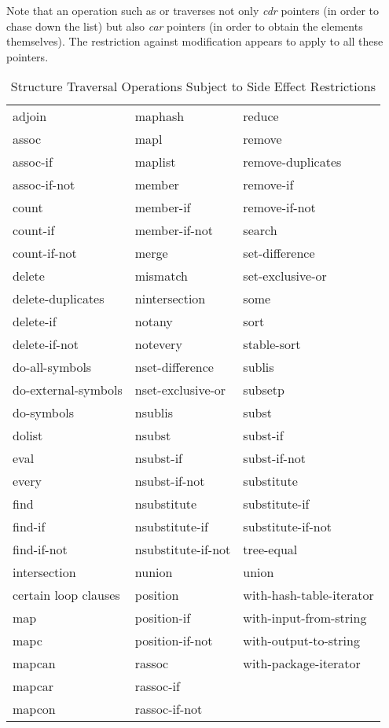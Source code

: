 Note that an operation such as  or  traverses
not only \emph{cdr} pointers (in order to chase down the list)
but also \emph{car} pointers (in order to obtain the elements themselves).
The restriction against modification appears to apply to all these pointers.

\begin{table}[t]
\leavevmode

\caption{Structure Traversal Operations Subject to Side Effect Restrictions}
\label{TRAVERSAL-OPERATIONS-TABLE}

\begingroup
\cf {}\relax
\begin{tabular*}{\textwidth}{@{}l@{\extracolsep{\fill}}ll@{}}
adjoin & maphash & reduce \\
assoc & mapl & remove \\
assoc-if & maplist & remove-duplicates \\
assoc-if-not & member & remove-if \\
count & member-if & remove-if-not \\
count-if & member-if-not & search \\
count-if-not & merge & set-difference \\
delete & mismatch & set-exclusive-or \\
delete-duplicates & nintersection & some \\
delete-if & notany & sort \\
delete-if-not & notevery & stable-sort \\
do-all-symbols & nset-difference & sublis \\
do-external-symbols & nset-exclusive-or & subsetp \\
do-symbols & nsublis & subst \\
dolist & nsubst & subst-if \\
eval & nsubst-if & subst-if-not \\
every & nsubst-if-not & substitute \\
find & nsubstitute & substitute-if \\
find-if & nsubstitute-if & substitute-if-not \\
find-if-not & nsubstitute-if-not & tree-equal \\
intersection & nunion & union \\
\textrm{certain} loop \textrm{clauses} & position & with-hash-table-iterator \\
map & position-if & with-input-from-string \\
mapc & position-if-not & with-output-to-string \\
mapcan & rassoc & with-package-iterator \\
mapcar & rassoc-if \\
mapcon & rassoc-if-not
\end{tabular*}
\endgroup
\end{table}

